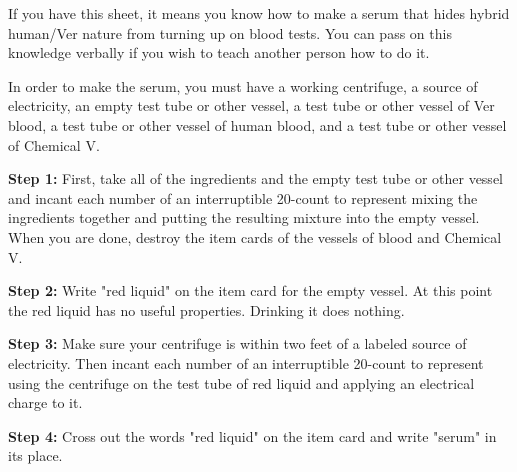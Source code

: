 \documentclass[green]{guildcamp4}
\begin{document}
\name{\gSerum{}}

If you have this sheet, it means you know how to make a serum that hides hybrid human/Ver nature from turning up on blood tests. You can pass on this knowledge verbally if you wish to teach another person how to do it.

In order to make the serum, you must have a working centrifuge, a source of electricity, an empty test tube or other vessel, a test tube or other vessel of Ver blood, a test tube or other vessel of human blood, and a test tube or other vessel of Chemical V.

{\bf Step 1:} First, take all of the ingredients and the empty test tube or other vessel and incant each number of an interruptible 20-count to represent mixing the ingredients together and putting the resulting mixture into the empty vessel. When you are done, destroy the item cards of the vessels of blood and Chemical V.

{\bf Step 2:} Write "red liquid" on the item card for the empty vessel. At this point the red liquid has no useful properties. Drinking it does nothing.

{\bf Step 3:} Make sure your centrifuge is within two feet of a labeled source of electricity. Then incant  each number of an interruptible 20-count to represent using the centrifuge on the test tube of red liquid and applying an electrical charge to it.

{\bf Step 4:} Cross out the words "red liquid" on the item card and write "serum" in its place.
\end{document}
